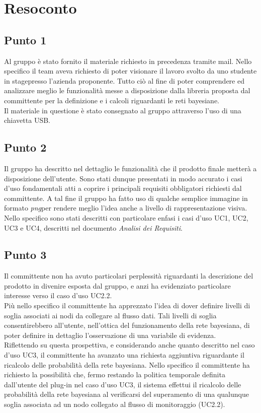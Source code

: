 \section{Resoconto}

\subsection{Punto 1}
Al gruppo è stato fornito il materiale richiesto in precedenza tramite mail.
Nello specifico il team aveva richiesto di poter visionare il lavoro svolto da uno studente in stage\glossario presso l'azienda proponente. Tutto ciò al fine di poter comprendere ed analizzare meglio le funzionalità messe a disposizione dalla libreria proposta dal committente per la definizione e i calcoli riguardanti le reti bayesiane.\\
Il materiale in questione è stato consegnato al gruppo attraverso l'uso di una chiavetta USB.

\subsection{Punto 2}
Il gruppo ha descritto nel dettaglio le funzionalità che il prodotto finale metterà a disposizione dell'utente. Sono stati dunque presentati in modo accurato i casi d'uso fondamentali atti a coprire i principali requisiti obbligatori richiesti dal committente. A tal fine il gruppo ha fatto uso di qualche semplice immagine in formato \textit{png}\glossario per rendere meglio l'idea anche a livello di rappresentazione visiva.\\
Nello specifico sono stati descritti con particolare enfasi i casi d'uso UC1, UC2, UC3 e UC4, descritti nel documento \textit{Analisi dei Requisiti}.

\subsection{Punto 3}
Il committente non ha avuto particolari perplessità riguardanti la descrizione del prodotto in divenire esposta dal gruppo, e anzi ha evidenziato particolare interesse verso il caso d'uso UC2.2.\\
Più nello specifico il committente ha apprezzato l'idea di dover definire livelli di soglia associati ai nodi da collegare al flusso dati. Tali livelli di soglia consentirebbero all'utente, nell'ottica del funzionamento della rete bayesiana, di poter definire in dettaglio l'osservazione di una variabile di evidenza.\\
Riflettendo su questa prospettiva, e considerando anche quanto descritto nel caso d'uso UC3, il committente ha avanzato una richiesta aggiuntiva riguardante il ricalcolo delle probabilità della rete bayesiana.
Nello specifico il committente ha richiesto la possibilità che, fermo restando la politica temporale definita dall'utente del plug-in nel caso d'uso UC3, il sistema effettui il ricalcolo delle probabilità della rete bayesiana al verificarsi del superamento di una qualunque soglia associata ad un nodo collegato al flusso di monitoraggio (UC2.2).
